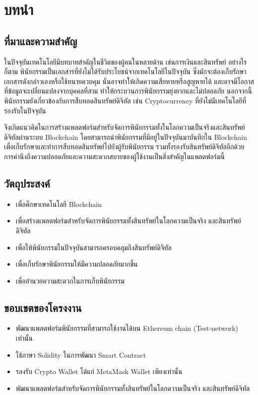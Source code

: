 \documentclass[12pt,oneside,openright,a4paper]{cpe-thai-project}
\begin{document}
\chapter{บทนำ}

\section{ที่มาและความสำคัญ}

\tab ในปัจจุบันเทคโนโลยีมีบทบาทสำคัญในชีวิตของผู้คนในหลายด้าน เช่นการเงินและสินทรัพย์ อย่างไรก็ตาม พินัยกรรมเป็นเอกสารที่ยังไม่ได้รับประโยชน์จากเทคโนโลยีในปัจจุบัน ซึ่งมักจะต้องเก็บรักษาเอกสารดังกล่าวเองหรือใช้ทนายควบคุม นั่นอาจทำให้เกิดความเสียหายหรือสูญหายได้ และอาจมีโอกาสที่ข้อมูลจะเปลี่ยนแปลงจากบุคคลที่สาม ทำให้กระบวนการพินัยกรรมยุ่งยากและไม่ปลอดภัย นอกจากนี้ พินัยกรรมยังเกี่ยวข้องกับการสืบทอดสินทรัพย์ดิจิทัล เช่น Cryptocurrency ที่ยังไม่มีเทคโนโลยีที่รองรับในปัจจุบัน

\tab จึงเกิดแนวคิดในการสร้างแพลตฟอร์มสำหรับจัดการพินัยกรรมทั้งในโลกความเป็นจริงและสินทรัพย์ดิจิทัลผ่านระบบ Blockchain โดยสามารถนำพินัยกรรมที่มีอยู่ในปัจจุบันมาบันทึกใน Blockchain เพื่อเก็บรักษาและทำการสืบทอดสินทรัพย์ไปยังผู้รับพินัยกรรม รวมทั้งรองรับสินทรัพย์ดิจิทัลอีกด้วย การคำนึงถึงความปลอดภัยและความสะดวกสบายของผู้ใช้งานเป็นสิ่งสำคัญในแพลตฟอร์มนี้


\section{วัตถุประสงค์}

\begin{itemize}
\item เพื่อศึกษาเทคโนโลยี Blockchain
\item เพื่อสร้างแพลตฟอร์มสำหรับจัดการพินัยกรรมทั้งสินทรัพย์ในโลกความเป็นจริง และสินทรัพย์ดิจิทัล
\item เพื่อให้พินัยกรรมในปัจจุบันสามารถครอบคลุมถึงสินทรัพย์ดิจิทัล
\item เพื่อเก็บรักษาพินัยกรรมให้มีความปลอดภัยมากขึ้น
\item เพื่ออำนวยความสะดวกในการเก็บพินัยกรรม
\end{itemize}

\section{ขอบเขตของโครงงาน}

\begin{itemize}
\item พัฒนาแพลตฟอร์มพินัยกรรมที่สามารถใช้งานได้บน Ethereum chain (Test-network) เท่านั้น
\item ใช้ภาษา Solidity ในการพัฒนา Smart Contract
\item รองรับ Crypto Wallet ได้แก่ MetaMask Wallet เพียงเท่านั้น
\item พัฒนาแพลตฟอร์มสำหรับจัดการพินัยกรรมทั้งสินทรัพย์ในโลกความเป็นจริง และสินทรัพย์ดิจิทัล
\end{itemize}
\end{document}
